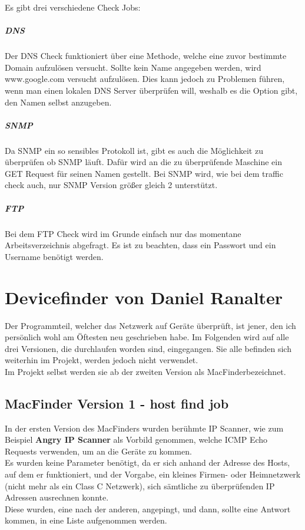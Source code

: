 \documentclass[12pt,a4paper]{report}
\begin{document}
Es gibt drei verschiedene Check Jobs:\\
\paragraph{DNS}
Der DNS Check funktioniert über eine Methode, welche eine zuvor bestimmte Domain aufzulösen versucht. Sollte kein Name angegeben werden, wird www.google.com versucht aufzulösen. Dies kann jedoch zu Problemen führen, wenn man einen lokalen DNS Server überprüfen will, weshalb es die Option gibt, den Namen selbst anzugeben.

\paragraph{SNMP}
Da SNMP ein so sensibles Protokoll ist, gibt es auch die Möglichkeit zu überprüfen ob SNMP läuft. Dafür wird an die zu überprüfende Maschine ein GET Request für seinen Namen gestellt. Bei SNMP wird, wie bei dem traffic check auch, nur SNMP Version größer gleich 2 unterstützt.

\paragraph{FTP}
Bei dem FTP Check wird im Grunde einfach nur das momentane Arbeitsverzeichnis abgefragt. Es ist zu beachten, dass ein Passwort und ein Username benötigt werden. 

\chapter{Devicefinder von Daniel Ranalter}
Der Programmteil, welcher das Netzwerk auf Geräte überprüft, ist jener, den ich persönlich wohl am Öftesten neu geschrieben habe. Im Folgenden wird auf alle drei Versionen, die durchlaufen worden sind, eingegangen. Sie alle befinden sich weiterhin im Projekt, werden jedoch nicht verwendet.\\
Im Projekt selbst werden sie ab der zweiten Version als \glqq MacFinder\grqq bezeichnet. 
\section{MacFinder Version 1 - host find job}
In der ersten Version des MacFinders wurden berühmte IP Scanner, wie zum Beispiel \textbf{Angry IP Scanner} als Vorbild genommen, welche ICMP Echo Requests verwenden, um an die Geräte zu kommen.\\
Es wurden keine Parameter benötigt, da er sich anhand der Adresse des Hosts, auf dem er funktioniert, und der Vorgabe, ein kleines Firmen- oder Heimnetzwerk (nicht mehr als ein Class C Netzwerk), sich sämtliche zu überprüfenden IP Adressen ausrechnen konnte.\\
Diese wurden, eine nach der anderen, \glqq angepingt\grqq , und dann, sollte eine Antwort kommen, in eine Liste aufgenommen werden.\\
\end{document}
